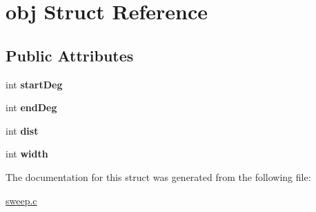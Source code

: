 \hypertarget{structobj}{}\section{obj Struct Reference}
\label{structobj}
\subsection*{Public Attributes}
\begin{DoxyCompactItemize}
\item 
\hypertarget{structobj_ae3341baa500342ac5cf6121788df5f01}{}int {\bfseries start\+Deg}\label{structobj_ae3341baa500342ac5cf6121788df5f01}

\item 
\hypertarget{structobj_ab17664e61556aa4ae45c2914f26d77ae}{}int {\bfseries end\+Deg}\label{structobj_ab17664e61556aa4ae45c2914f26d77ae}

\item 
\hypertarget{structobj_ad431c51ebe20be44b657ff6ab28c328a}{}int {\bfseries dist}\label{structobj_ad431c51ebe20be44b657ff6ab28c328a}

\item 
\hypertarget{structobj_a2d95ebdd730b0e03b3e259a959e5734b}{}int {\bfseries width}\label{structobj_a2d95ebdd730b0e03b3e259a959e5734b}

\end{DoxyCompactItemize}


The documentation for this struct was generated from the following file\+:\begin{DoxyCompactItemize}
\item 
\hyperlink{sweep_8c}{sweep.\+c}\end{DoxyCompactItemize}
